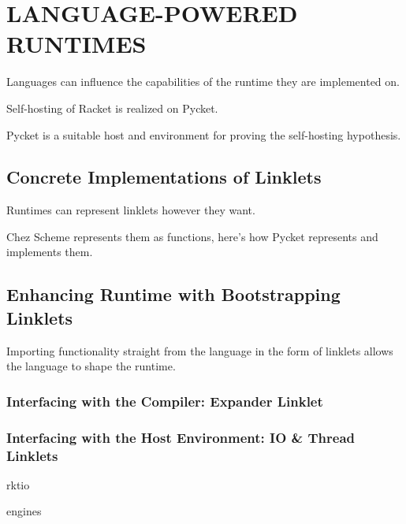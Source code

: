 \chapter[\texorpdfstring{LANGUAGE-POWERED RUNTIMES}
                          {4. Self-hosting Pycket}]{LANGUAGE-POWERED RUNTIMES}
	\label{chapter:pycket}

	\begin{chaptersynopsis}
		Languages can influence the capabilities of the runtime they are implemented on.

		Self-hosting of Racket is realized on Pycket.

	\end{chaptersynopsis}

	\begin{paragraph-here}
		Pycket is a suitable host and environment for proving the self-hosting hypothesis.
	\end{paragraph-here}

	\section{Concrete Implementations of Linklets}

		\begin{mainpoint}
			Runtimes can represent linklets however they want.

			Chez Scheme represents them as functions, here's how Pycket represents and implements them.
		\end{mainpoint}

	\section{Enhancing Runtime with Bootstrapping Linklets}
		\begin{mainpoint}
			Importing functionality straight from the language in the form of linklets allows the language to shape the runtime.
		\end{mainpoint}
		\subsection{Interfacing with the Compiler: Expander Linklet}

		\subsection{Interfacing with the Host Environment: IO \& Thread Linklets}
			\begin{todo}[TODO]
				rktio
			\end{todo}
			\begin{todo}[TODO]
				engines
			\end{todo}
